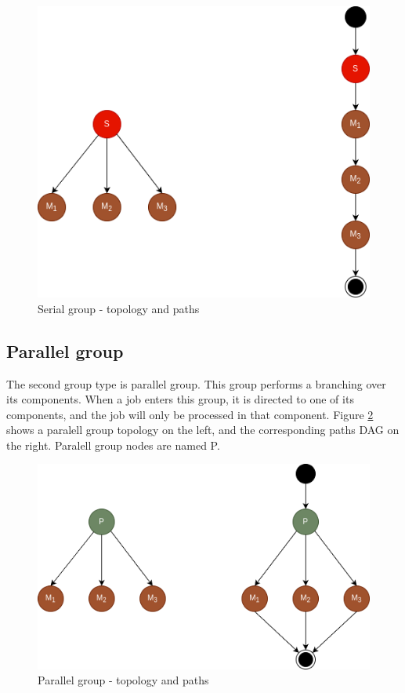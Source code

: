 \begin{figure}[!htbp]
	\centering
	\includegraphics[scale=0.6]{../images/serial_group.png}
	\caption{Serial group - topology and paths}
    \label{fig:serial_group}
\end{figure}

\subsection{Parallel group}

The second group type is parallel group. This group performs a branching over its components. When a job enters this group, it is directed to one of its components, and the job will only be processed in that component. Figure \ref{fig:parallel_group} shows a paralell group topology on the left, and the corresponding paths DAG on the right. Paralell group nodes are named P.

\begin{figure}[!htbp]
	\centering
	\includegraphics[scale=0.6]{../images/parallel_group.png}
	\caption{Parallel group - topology and paths}
    \label{fig:parallel_group}
\end{figure}

